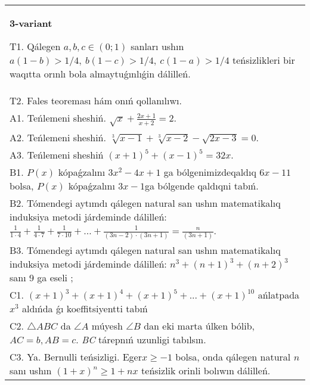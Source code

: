 \documentclass{article}
\begin{document}
\begin{tabular}{m{17cm}}
\textbf{3-variant}
\newline

T1. Qálegen \(a,b,c \in (0;1)\) sanları ushın \(a(1 - b) > 1/4,\ b(1 - c) > 1/4,\ c(1 - a) > 1/4\) teńsizlikleri bir waqıtta orınlı bola almaytuǵınlıǵin dálilleń. \\
T2. Fales teoreması hám onıń qollanılıwı. \\
A1. Teńlemeni sheshiń. \(\sqrt{x} + \frac{2x + 1}{x + 2} = 2\). \\
A2. Teńlemeni sheshiń. \(\sqrt[3]{x - 1} + \sqrt[3]{x - 2} - \sqrt{2x - 3} = 0\). \\
A3. Teńlemeni sheshiń \((x + 1)^{5} + (x - 1)^{5} = 32x\). \\
B1. \(P(x)\) kópaǵzalını \(3x^{2} - 4x + 1\) ga bólgenimizdeqaldıq \(6x - 11\) bolsa, \(P(x)\) kópaǵzalını \(3x - 1\)ga bólgende qaldıqni tabıń. \\
B2. Tómendegi aytımdı qálegen natural san ushın matematikalıq induksiya metodi járdeminde dálilleń: \(\frac{1}{1 \cdot 4} + \frac{1}{4 \cdot 7} + \frac{1}{7 \cdot 10} + \ldots + \frac{1}{(3n - 2) \cdot (3n + 1)} = \frac{n}{(3n + 1)}\). \\
B3. Tómendegi aytımdı qálegen natural san ushın matematikalıq induksiya metodi járdeminde dálilleń: \(n^{3} + (n + 1)^{3} + (n + 2)^{3}\) sanı 9 ga eseli ; \\
C1. \((x + 1)^{3} + (x + 1)^{4} + (x + 1)^{5} + ... + (x + 1)^{10}\) ańlatpada \(x^{3}\) aldıńda ǵı koeffitsiyentti tabıń \\
C2. \(\bigtriangleup ABC\) da \(\angle A\) múyesh \(\angle B\) dan eki marta úlken bólib, \(AC = b,AB = c\). \emph{BC} tárepnıń uzunligi tabılsın. \\
C3. Ya. Bernulli teńsizligi. Eger\(x \geq - 1\) bolsa, onda qálegen natural \(n\) sanı ushın \((1 + x)^{n} \geq 1 + nx\) teńsizlik orinli bolıwın dálilleń. \\

\end{tabular}
\vspace{1cm}
\end{document}
